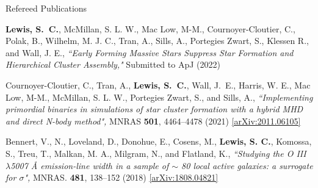 \documentclass{resume} %
\begin{document}
\begin{rSection}{Refereed Publications}

\begin{etaremune}
\item \textbf{{Lewis}, S.~C.}, {McMillan}, S. L. W., {Mac Low}, M-M., {Cournoyer-Cloutier}, C., {Polak}, B., {Wilhelm}, M. J. C., {Tran}, A., {Sills}, A., {Portegies Zwart}, S., {Klessen} R., and {Wall}, J. E., \textit{``Early Forming Massive Stars Suppress Star Formation and Hierarchical Cluster Assembly,"} Submitted to ApJ (2022) %
 
\item {Cournoyer-Cloutier}, C., {Tran}, A., \textbf{{Lewis}, S.~C.}, {Wall}, J.~E., {Harris}, W. E., {Mac Low}, M-M., {McMillan}, S. L. W., {Portegies Zwart}, S., and {Sills}, A., \textit{``Implementing primordial binaries in simulations of star cluster formation with a hybrid MHD and direct N-body method",} MNRAS \textbf{501}, 4464--4478 (2021) \href{https://arxiv.org/abs/2011.06105}{[arXiv:2011.06105]}
  
\item {Bennert}, V., N., {Loveland}, D., {Donohue}, E., {Cosens}, M., \textbf{{Lewis}, S. C.}, {Komossa}, S., {Treu}, T., {Malkan}, M. A., {Milgram}, N., and {Flatland}, K., \textit{``Studying the O III $\lambda$5007 Å emission-line width in a sample of $\sim$ 80 local active galaxies: a surrogate for $\sigma$",} MNRAS. \textbf{481}, 138--152 (2018) \href{https://arxiv.org/abs/1808.04821}{[arXiv:1808.04821]}
\end{etaremune}

\end{rSection}



\end{document}
